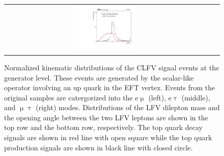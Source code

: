\begin{figure}[tbh!]
\begin{center}
\begin{tabular}{ccc}
 \includegraphics[width=0.33\textwidth]{figures/Part4/Signal/llDr_mutau}\\
 \end{tabular}
 \caption{Normalized kinematic distributions of the \ac{CLFV} signal events at the generator level. These events are generated by the scalar-like operator involving an up quark in the \ac{EFT} vertex. Events from the original samples are catergorized into the e$\upmu$ (left), e$\uptau$ (middle), and $\upmu\uptau$ (right) modes. Distributions of the LFV dilepton mass and the opening angle between the two LFV leptons are shown in the top row and the bottom row, respectively. The top quark decay signals are shown in red line with open square while the top quark production signals are shown in black line with closed circle.}
 \label{fig:SigGen}
 \end{center}
 \end{figure}